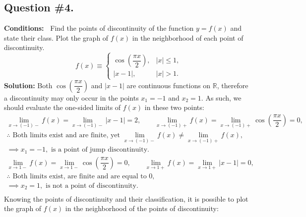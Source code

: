 \subsection*{\center Question \#4.}
{\bf Conditions:~}
Find the points of discontinuity of the function $y=f(x)$ and state their class. Plot the graph of $f(x)$ in the neighborhood of each point of discontinuity.
$$
f(x) \equiv 
\begin{cases}
\cos{\left(\dfrac{\pi x}{2}\right)},	& |x|\leqslant1, \\
|x-1|,   & |x|>1.
\end{cases}
$$
{\bf Solution:}
Both $\cos{\left(\dfrac{\pi x}{2}\right)}$ and $|x-1|$ are continuous functions on $\mathbb{R}$, therefore a discontinuity may only occur in the points $x_1=-1$ and $x_2=1$. As such, we should evaluate the one-sided limits of $f(x)$ in these two points:
$$
\begin{array}{c}
\lim\limits_{x\rightarrow(-1)-}f(x) = 
\lim\limits_{x\rightarrow(-1)-}|x-1| = 2, \qquad
\lim\limits_{x\rightarrow(-1)+}f(x) = 
\lim\limits_{x\rightarrow(-1)+}\cos{\left(\dfrac{\pi x}{2}\right)} = 0, \\[12pt]
\therefore\text{ Both limits exist and are finite, yet }\lim\limits_{x\rightarrow(-1)-}f(x)\neq \lim\limits_{x\rightarrow(-1)+}f(x), \\
\implies x_1=-1, \text{ is a point of jump discontinuity.} \\[16pt]
\lim\limits_{x\rightarrow1-}f(x) = 
\lim\limits_{x\rightarrow1-}\cos{\left(\dfrac{\pi x}{2}\right)} = 0, \qquad
\lim\limits_{x\rightarrow1+}f(x) = 
\lim\limits_{x\rightarrow1+}|x-1| = 0, \\
\therefore\text{ Both limits exist, are finite and are equal to 0,} \\
\implies x_2=1, \text{ is not a point of discontinuity.} \\[15pt]
\end{array}
$$
Knowing the points of discontinuity and their classification, it is possible to plot the graph of $f(x)$ in the neighborhood of the points of discontinuity:
\vspace{0.2cm}
\begin{center}
\end{center}
